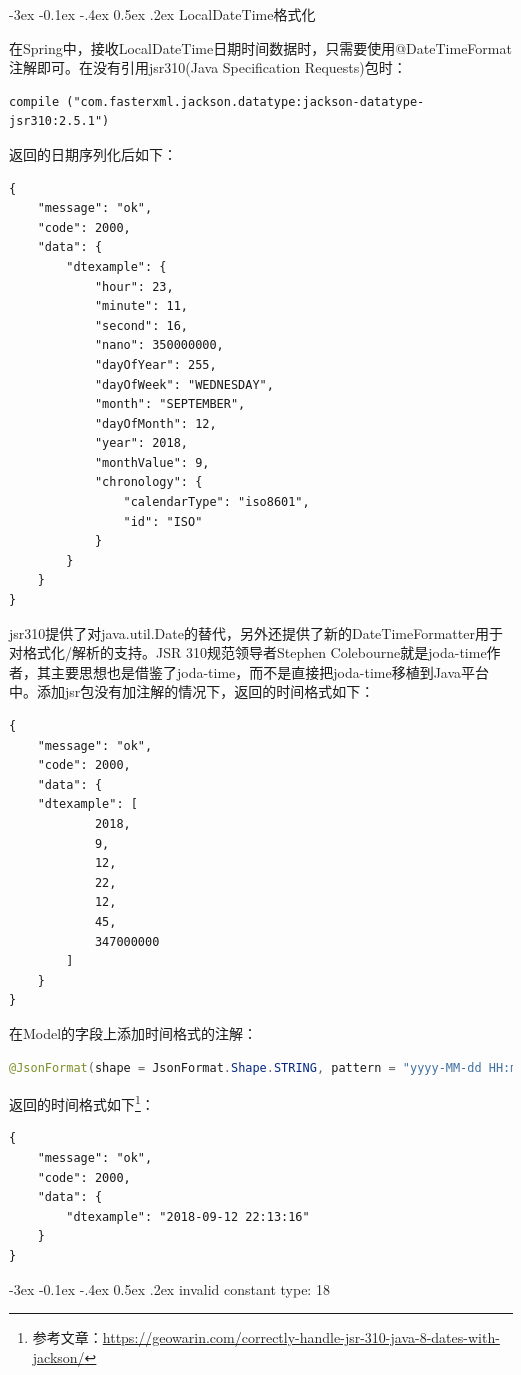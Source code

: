 \documentclass[8pt]{book}
\makeatletter
\numberwithin{dummy}{section}
\theoremstyle{ocrenumbox}
\theoremstyle{blacknumex}
\theoremstyle{blacknumbox}
\theoremstyle{ocrenum}
\renewcommand{\subsection}{\@startsection {subsection}{2}{\z@}
	{-3ex \@plus -0.1ex \@minus -.4ex}
	{0.5ex \@plus.2ex }
	{\normalfont\sffamily\bfseries}}
\makeatother
\begin{document}
\subsection{LocalDateTime格式化}

在Spring中，接收LocalDateTime日期时间数据时，只需要使用@DateTimeFormat注解即可。在没有引用jsr310(Java Specification Requests)包时：

\begin{lstlisting}
compile ("com.fasterxml.jackson.datatype:jackson-datatype-jsr310:2.5.1")
\end{lstlisting}

返回的日期序列化后如下：
\begin{lstlisting}
{
	"message": "ok",
	"code": 2000,
	"data": {
		"dtexample": {
			"hour": 23,
			"minute": 11,
			"second": 16,
			"nano": 350000000,
			"dayOfYear": 255,
			"dayOfWeek": "WEDNESDAY",
			"month": "SEPTEMBER",
			"dayOfMonth": 12,
			"year": 2018,
			"monthValue": 9,
			"chronology": {
				"calendarType": "iso8601",
				"id": "ISO"
			}
		}
	}
}
\end{lstlisting}

jsr310提供了对java.util.Date的替代，另外还提供了新的DateTimeFormatter用于对格式化/解析的支持。JSR 310规范领导者Stephen Colebourne就是joda-time作者，其主要思想也是借鉴了joda-time，而不是直接把joda-time移植到Java平台中。添加jsr包没有加注解的情况下，返回的时间格式如下：

\begin{lstlisting}
{
	"message": "ok",
	"code": 2000,
	"data": {
	"dtexample": [
			2018,
			9,
			12,
			22,
			12,
			45,
			347000000
		]
	}
}

\end{lstlisting}

在Model的字段上添加时间格式的注解：

\begin{lstlisting}[language=Java]
@JsonFormat(shape = JsonFormat.Shape.STRING, pattern = "yyyy-MM-dd HH:mm:ss", timezone = "GMT+8")
\end{lstlisting}

返回的时间格式如下\footnote{参考文章：\url{https://geowarin.com/correctly-handle-jsr-310-java-8-dates-with-jackson/}}：

\begin{lstlisting}
{
	"message": "ok",
	"code": 2000,
	"data": {
		"dtexample": "2018-09-12 22:13:16"
	}
}
\end{lstlisting}

\subsection{invalid constant type: 18}
\end{document}
